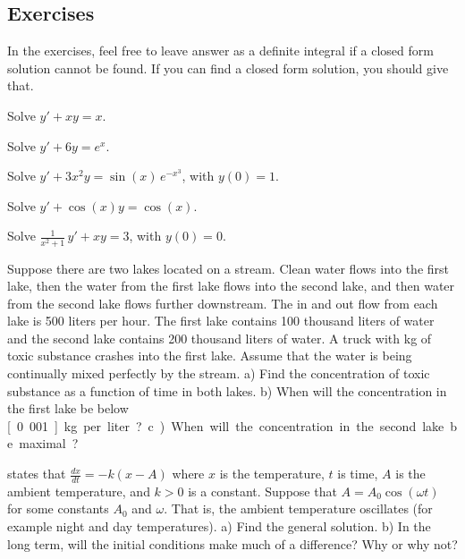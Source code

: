 \documentclass[12pt]{book}
\begin{document}
\subsection{Exercises}

In the exercises, feel free to leave answer as a definite integral if a
closed form solution cannot be found.  If you can find a closed form
solution, you should give that.

\begin{exercise}
Solve $y' + xy = x$.
\end{exercise}

\begin{exercise}
Solve $y' + 6y = e^x$.
\end{exercise}

\begin{exercise}
Solve $y' + 3x^2y = \sin(x) \, e^{-x^3}$, with $y(0) = 1$.
\end{exercise}

\begin{exercise}
Solve $y' + \cos (x) y = \cos(x)$.
\end{exercise}

\begin{exercise}
Solve $\frac{1}{x^2+1} \, y' + x y = 3$, with $y(0) = 0$.
\end{exercise}

\begin{exercise}
Suppose there are two lakes located on a stream.  Clean
water flows into the first lake,
then the water from the first lake flows into the second lake, and then
water from the second lake flows further downstream.
The in and out flow from each lake is 500 liters per hour.
The first lake contains 100 thousand liters of water and the
second lake contains 200 thousand liters of water.
A truck with \unit[500]{kg} of toxic substance
crashes into the first lake.  Assume that the water is being continually
mixed perfectly by the stream.  a) Find the concentration of toxic substance
as a function of time in both lakes.  b) When will the
concentration in the first lake be below \unit[0.001]{kg} per liter?
c) When will the
concentration in the second lake be maximal?
\end{exercise}

\begin{exercise}
 states that $\frac{dx}{dt} = -k(x-A)$ where
$x$ is the temperature, $t$ is time, $A$ is the ambient temperature,
and $k > 0$ is a constant.
Suppose that $A = A_0 \cos (\omega t)$ for some constants $A_0$ and $\omega$.
That is, the ambient temperature oscillates (for example night and day
temperatures).  a) Find the general solution.  b) In the long term, will the
initial conditions make much of a difference?  Why or why not?
\end{exercise}
\end{document}
